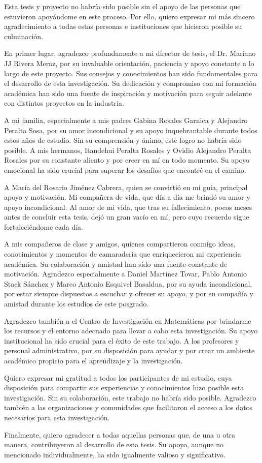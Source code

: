 
Esta tesis y proyecto no habría sido posible sin el apoyo de las personas que estuvieron apoyándome
en este proceso. Por ello, quiero expresar mi más sincero agradecimiento a todas estas personas e
instituciones que hicieron posible su culminación.

En primer lugar, agradezco profundamente a mi director de tesis, el Dr. Mariano JJ Rivera Meraz, por
su invaluable orientación, paciencia y apoyo constante a lo largo de este proyecto. Sus consejos y
conocimientos han sido fundamentales para el desarrollo de esta investigación. Su dedicación y
compromiso con mi formación académica han sido una fuente de inspiración y motivación para seguir
adelante con distintos proyectos en la industria.

A mi familia, especialmente a mis padres Gabina Rosales Garnica y Alejandro Peralta Sosa, por su
amor incondicional y su apoyo inquebrantable durante todos estos años de estudio.
Sin su comprensión y ánimo, este logro no habría sido posible. A mis hermanos, Itandehui Peralta
Rosales y Ovidio Alejandro Peralta Rosales por su constante aliento y por creer en mí en todo
momento. Su apoyo emocional ha sido crucial para superar los desafíos que encontré en el camino.

A María del Rosario Jiménez Cabrera, quien se convirtió en mi guía, principal apoyo y motivación. Mi
compañera de vida, que día a día me brindó su amor y apoyo incondicional. Al amor de mi vida, que
tras su fallecimiento, pocos meses antes de concluir esta tesis, dejó un gran vacío en mí, pero cuyo
recuerdo sigue fortaleciéndome cada día.

A mis compañeros de clase y amigos, quienes compartieron conmigo ideas, conocimientos y momentos de
camaradería que enriquecieron mi experiencia académica. Su colaboración y amistad han sido una
fuente constante de motivación. Agradezco especialmente a Daniel Martínez Tovar, Pablo Antonio
Stack Sánchez y Marco Antonio Esquivel Basaldua, por su ayuda incondicional, por estar siempre
dispuestos a escuchar y ofrecer su apoyo, y por su compañía y amistad durante los estudios de este
posgrado.

Agradezco también a el Centro de Investigación en Matemáticas por brindarme los recursos y el
entorno adecuado para llevar a cabo esta investigación. Su apoyo institucional ha sido crucial para
el éxito de este trabajo. A los profesores y personal administrativo, por su disposición para ayudar
y por crear un ambiente académico propicio para el aprendizaje y la investigación.

Quiero expresar mi gratitud a todos los participantes de mi estudio, cuya disposición para compartir
sus experiencias y conocimientos hizo posible esta investigación. Sin su colaboración, este trabajo
no habría sido posible. Agradezco también a las organizaciones y comunidades que facilitaron el
acceso a los datos necesarios para esta investigación.

Finalmente, quiero agradecer a todas aquellas personas que, de una u otra manera, contribuyeron al
desarrollo de esta tesis. Su apoyo, aunque no mencionado individualmente, ha sido igualmente valioso
y significativo.
